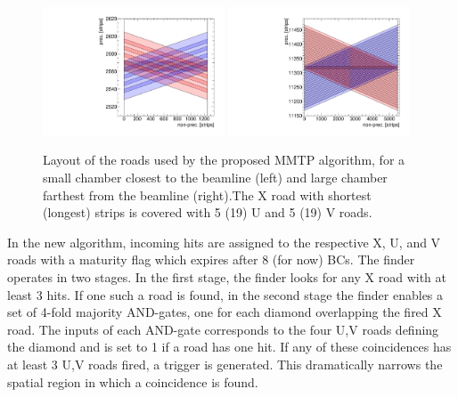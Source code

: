 \begin{figure}[!htpb]
  \begin{center}
    \includegraphics[width=0.48\textwidth]{figures/cartoon_roads_small_smallstereo_N.pdf}
    \includegraphics[width=0.48\textwidth]{figures/cartoon_roads_large_smallstereo_N.pdf}
  \end{center}
  \vspace{-10pt}
  \caption{Layout of the roads used by the proposed MMTP algorithm, for a small chamber closest to the beamline (left) and large chamber farthest
 from the beamline (right).The X road with shortest (longest) strips is covered with 5 (19) U and 5 (19) V roads.}
  \label{fig:cartoon_smallroads_N}
\end{figure}

 In the new algorithm, incoming hits are assigned to the respective X, U, and V roads with a maturity flag which expires after 8 (for now) BCs.  
 The  finder operates in two stages. In the first stage, the finder looks for any X road with at least 3 hits.
 If one such a road is found, in the second stage the finder enables a set of 4-fold majority AND-gates,
 one for each diamond overlapping the fired X road. The inputs
 of  each AND-gate corresponds to the four U,V roads defining the diamond and is set to 1 if a road has  one hit.
 If any of these coincidences has at least 3 U,V roads fired, a trigger is generated.
 This dramatically narrows the spatial region in which a coincidence is found.

